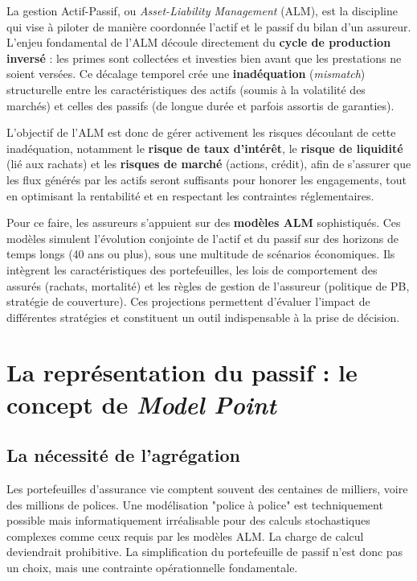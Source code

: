 La gestion Actif-Passif, ou \textit{Asset-Liability Management} (ALM), est la discipline qui vise à piloter de manière coordonnée l'actif et le passif du bilan d'un assureur. L'enjeu fondamental de l'ALM découle directement du \textbf{cycle de production inversé} : les primes sont collectées et investies bien avant que les prestations ne soient versées. Ce décalage temporel crée une \textbf{inadéquation} (\textit{mismatch}) structurelle entre les caractéristiques des actifs (soumis à la volatilité des marchés) et celles des passifs (de longue durée et parfois assortis de garanties).

\bigskip

L'objectif de l'ALM est donc de gérer activement les risques découlant de cette inadéquation, notamment le \textbf{risque de taux d'intérêt}, le \textbf{risque de liquidité} (lié aux rachats) et les \textbf{risques de marché} (actions, crédit), afin de s'assurer que les flux générés par les actifs seront suffisants pour honorer les engagements, tout en optimisant la rentabilité et en respectant les contraintes réglementaires.

\bigskip

Pour ce faire, les assureurs s'appuient sur des \textbf{modèles ALM} sophistiqués. Ces modèles simulent l'évolution conjointe de l'actif et du passif sur des horizons de temps longs (40 ans ou plus), sous une multitude de scénarios économiques. Ils intègrent les caractéristiques des portefeuilles, les lois de comportement des assurés (rachats, mortalité) et les règles de gestion de l'assureur (politique de PB, stratégie de couverture). Ces projections permettent d'évaluer l'impact de différentes stratégies et constituent un outil indispensable à la prise de décision.

\section{La représentation du passif : le concept de \textit{Model Point}}
\label{sec:mp}

\subsection{La nécessité de l'agrégation}

Les portefeuilles d'assurance vie comptent souvent des centaines de milliers, voire des millions de polices. Une modélisation "police à police" est techniquement possible mais informatiquement irréalisable pour des calculs stochastiques complexes comme ceux requis par les modèles ALM. La charge de calcul deviendrait prohibitive. La simplification du portefeuille de passif n'est donc pas un choix, mais une contrainte opérationnelle fondamentale.

